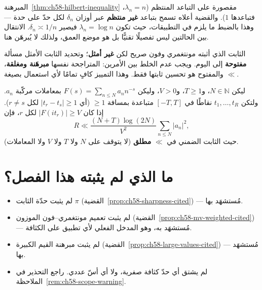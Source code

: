 \begin{remark}
\label{rem:ch58-mv-vs-schur}
المبرهنة~\ref{thm:ch58-hilbert-inequality} مقصورة على التباعد المنتظم
(\(\lambda_n=n\)، فتباعدها \(1\)). والقضية أعلاه تسمح بتباعد
\textbf{غير منتظم} عبر أوزان \(\delta_n\) لكل حدّ على حدة — وهذا بالضبط
ما يلزم في التطبيقات، حيث تكون \(\lambda_n=\log n\) فيصير
\(\delta_n\asymp1/n\). الانتقال بين الحالتين ليس تفصيلًا تقنيًّا بل هو
موضع العمق، ولذلك لا يُبرهَن هنا.

الثابت الذي أثبته مونتغمري وفون صريح لكن \textbf{غير أمثل}؛ وتحديد
الثابت الأمثل مسألة \textbf{مفتوحة} إلى اليوم. ويجب عدم الخلط بين
الأمرين: المتراجحة نفسها \textbf{مبرهَنة ومغلقة}، والمفتوح هو تحسين
ثابتها فقط. وهذا التمييز كافٍ تمامًا لأي استعمال بصيغة \(\ll\).
\end{remark}

\begin{proposition}
\label{prop:ch58-large-values-cited}
ليكن \(N\in\mathbb{N}\)، و\(T\ge1\)، و\(V>0\)، وليكن
\(F(s)=\sum_{n\le N}a_nn^{-s}\) بمعاملات مركّبة \(a_n\). ولتكن
\(t_1,\dots,t_R\) نقاطًا في \([-T,T]\) متباعدة بمسافة \(\ge1\)
(أي \(\lvert t_r-t_s\rvert\ge1\) لكل \(r\ne s\)). إذا كان
\(\lvert F(it_r)\rvert\ge V\) لكل \(r\)، فإن
\[
R\ll\frac{(N+T)\log(2N)}{V^2}\sum_{n\le N}\lvert a_n\rvert^2,
\]
حيث الثابت الضمني في \(\ll\) \textbf{مطلق} (لا يتوقف على \(N\) ولا
\(T\) ولا \(V\) ولا المعاملات).
\end{proposition}

\section{ما الذي لم يثبته هذا الفصل؟}

\begin{itemize}
  \item لم يثبت حدّة الثابت \(\pi\)
  (القضية~\ref{prop:ch58-sharpness-cited}) — مُستشهَد بها.
  \item لم يثبت تعميم مونتغمري–فون الموزون
  (القضية~\ref{prop:ch58-mv-weighted-cited}) — مُستشهَد به، وهو المدخل
  الفعلي لأي تطبيق على الكثافة.
  \item لم يثبت مبرهنة القيم الكبيرة
  (القضية~\ref{prop:ch58-large-values-cited}) — مُستشهَد بها.
  \item لم يشتق أي حدّ كثافة صفرية، ولا أي أسّ عددي. راجع التحذير في
  الملاحظة~\ref{rem:ch58-scope-warning}.
\end{itemize}

